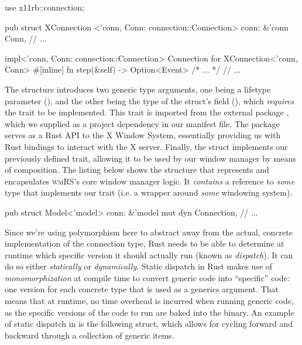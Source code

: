 \begin{rustblock}
  use x11rb::connection;
\end{rustblock}
\begin{rustblock}
  pub struct XConnection
    <'conn, Conn: connection::Connection>
  {
    conn: &'conn Conn,
    // ...
  }
\end{rustblock}
\begin{rustblock}
  impl<'conn, Conn: connection::Connection>
    Connection for XConnection<'conn, Conn>
  {
    #[inline]
    fn step(&self) -> Option<Event> { /* ... */ }
    // ...
  }
\end{rustblock}

The  structure introduces two generic type arguments, one
being a lifetype parameter (), and the other being the type
of the struct's  field (), which \textit{requires}
the  trait to be implemented. This
 trait is imported from the external package
, which we supplied as a project dependency in our manifest file. The
 package serves as a Rust API to the X Window System, essentially
providing us with Rust bindings to interact with the X server. Finally, the
 struct implements our previously defined 
trait, allowing it to be used by our window manager by means of composition.
The listing below shows the structure that represents and encapsulates
\textsc{wmRS}'s core window manager logic. It \textit{contains} a reference to
\textit{some} type that implements our  trait (i.e. a wrapper
around \textit{some} windowing system).

\begin{rustblock}
  pub struct Model<'model> {
    conn: &'model mut dyn Connection,
    // ...
  }
\end{rustblock}


Since we're using polymorphism here to abstract away from the actual,
concrete implementation of the connection type, Rust needs to be able to
determine at runtime which specific version it should actually run (known as
\textit{dispatch})\cite{therustbook, rustblogtraits}. It can do so either
\textit{statically} or \textit{dynamically}. Static dispatch in Rust makes
use of \textit{monomorphization} at compile time to convert generic code into
``specific'' code: one version for each concrete type that is used as a generics
argument\cite{therustbook, rustblogtraits}. That means that at runtime, no time
overhead is incurred when running generic code, as the specific versions of the
code to run are baked into the binary\cite{therustbook, rustblogtraits}. An
example of static dispatch in \wmrs is the following  struct, which
allows for cycling forward and backward through a collection of generic items.

